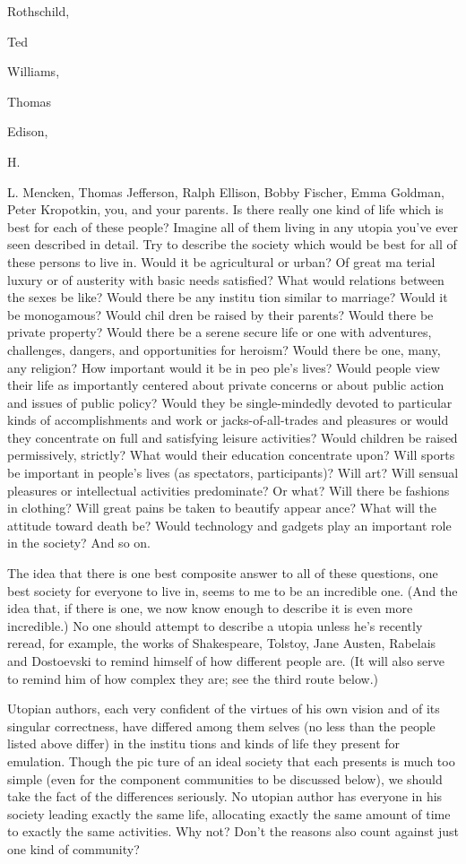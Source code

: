 \documentclass[11pt,openany]{book}
\begin{document}
Rothschild, 

Ted 

Williams, 

Thomas 

Edison, 

H. 

L. Mencken, Thomas Jefferson, Ralph Ellison, Bobby Fischer, Emma Goldman, Peter Kropotkin, you, and your parents. Is there really one kind of life which is best for each of these people? Imagine all of them living in any utopia you've ever seen described in detail. Try to describe the society which would be best for all of these persons to live in. Would it be agricultural or urban? Of great ma terial luxury or of austerity with basic needs satisfied? What would relations between the sexes be like? Would there be any institu tion similar to marriage? Would it be monogamous? Would chil dren be raised by their parents? Would there be private property? Would there be a serene secure life or one with adventures, challenges, dangers, and opportunities for heroism? Would there be one, many, any religion? How important would it be in peo ple's lives? Would people view their life as importantly centered about private concerns or about public action and issues of public policy? Would they be single-mindedly devoted to particular kinds of accomplishments and work or jacks-of-all-trades and pleasures or would they concentrate on full and satisfying leisure activities? Would children be raised permissively, strictly? What would their education concentrate upon? Will sports be important in people's lives (as spectators, participants)? Will art? Will sensual pleasures or intellectual activities predominate? Or what? Will there be fashions in clothing? Will great pains be taken to beautify appear ance? What will the attitude toward death be? Would technology and gadgets play an important role in the society? And so on. 

The idea that there is one best composite answer to all of these questions, one best society for everyone to live in, seems to me to be an incredible one. (And the idea that, if there is one, we now know enough to describe it is even more incredible.) No one should attempt to describe a utopia unless he's recently reread, for example, the works of Shakespeare, Tolstoy, Jane Austen, Rabelais and Dostoevski to remind himself of how different people are. (It will also serve to remind him of how complex they are; see the third route below.) 

Utopian authors, each very confident of the virtues of his own vision and of its singular correctness, have differed among them selves (no less than the people listed above differ) in the institu tions and kinds of life they present for emulation. Though the pic ture of an ideal society that each presents is much too simple (even for the component communities to be discussed below), we should take the fact of the differences seriously. No utopian author has everyone in his society leading exactly the same life, allocating exactly the same amount of time to exactly the same activities. Why not? Don't the reasons also count against just one kind of community? 
\end{document}

